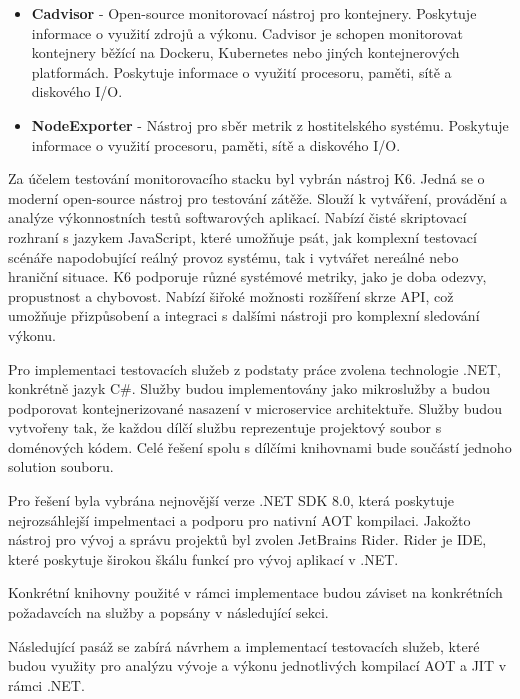 \begin{itemize}
  \item \textbf{Cadvisor} - Open-source monitorovací nástroj pro kontejnery. Poskytuje informace o využití zdrojů a výkonu. Cadvisor je schopen monitorovat kontejnery běžící na Dockeru, Kubernetes nebo jiných kontejnerových platformách. Poskytuje informace o využití procesoru, paměti, sítě a diskového I/O.
  \item \textbf{NodeExporter} - Nástroj pro sběr metrik z hostitelského systému. Poskytuje informace o využití procesoru, paměti, sítě a diskového I/O.
\end{itemize}


Za účelem testování monitorovacího stacku byl vybrán nástroj K6. Jedná se o moderní open-source nástroj pro testování zátěže. Slouží k vytváření, provádění a analýze výkonnostních testů softwarových aplikací. Nabízí čisté skriptovací rozhraní s jazykem JavaScript, které umožňuje psát, jak komplexní testovací scénáře napodobující reálný provoz systému, tak i vytvářet nereálné nebo hraniční situace. K6 podporuje různé systémové metriky, jako je doba odezvy, propustnost a chybovost. Nabízí šiřoké možnosti rozšíření skrze API, což umožňuje přizpůsobení a integraci s dalšími nástroji pro komplexní sledování výkonu.


Pro implementaci testovacích služeb z podstaty práce zvolena technologie .NET, konkrétně jazyk C\#. Služby budou implementovány jako mikroslužby a budou podporovat kontejnerizované nasazení v microservice architektuře. Služby budou vytvořeny tak, že každou dílčí službu reprezentuje projektový soubor s doménových kódem. Celé řešení spolu s dílčími knihovnami bude součástí jednoho solution souboru.

Pro řešení byla vybrána nejnovější verze .NET SDK 8.0, která poskytuje nejrozsáhlejší impelmentaci a podporu pro nativní AOT kompilaci. Jakožto nástroj pro vývoj a správu projektů byl zvolen JetBrains Rider. Rider je IDE, které poskytuje širokou škálu funkcí pro vývoj aplikací v .NET.

Konkrétní knihovny použité v rámci implementace budou záviset na konkrétních požadavcích na služby a popsány v následující sekci.


Následující pasáž se zabírá návrhem a implementací testovacích služeb, které budou využity pro analýzu vývoje a výkonu jednotlivých kompilací AOT a JIT v rámci .NET.

